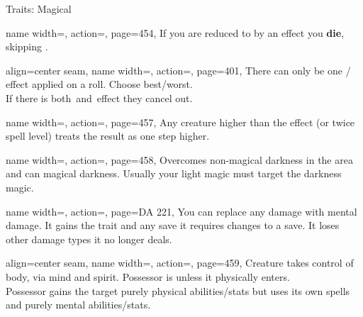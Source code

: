 \begin{PageFrontLandscape}
\begin{TablesHalf}{\frontTableHeight}
\begin{Table}{Traits: Magical}
\begin{entry}{}{%
                name width=\conditionLength,%
                action=\Death,
                page=454,
            }
                If you are reduced to  \HPs by an effect you \textbf{die}, skipping .
            \end{entry}
            \begin{entry}{}{%
                align=center seam,
                name width=\conditionLength,%
                action=\stackbox[l][c]{\Fortune\\\vspace{-0.6ex}\Misfortune},
                page=401,
            }
                There can only be one \Fortune/\Misfortune\,effect applied on a roll.
                Choose best/worst.\\
                If there is both \Fortune\,and \Misfortune\,effect they cancel out.
            \end{entry}
            \begin{entry}{}{%
                name width=\conditionLength,%
                action=\Incapacitation,
                page=457,
            }
                Any creature higher than the effect (or twice spell level) treats the result as one step higher.
            \end{entry}
            \begin{entry}{}{%
                name width=\conditionLength,%
                action=\Light,
                page=458,
            }
                Overcomes non-magical darkness in the area and can  magical darkness.
                Usually your light magic must target the darkness magic.
            \end{entry}
            \begin{entry}{}{%
                name width=\conditionLength,%
                action=\Mindshift,
                page=DA 221,
            }
                You can replace any damage with mental damage.
                It gains the \Mental trait and any save it requires changes to a \WillT save.
                It loses other damage types it no longer deals.
            \end{entry}
            \begin{entry}{}{%
                align=center seam,
                name width=\conditionLength,%
                action=\Possession,
                page=459,
            }
                Creature takes control of body, via mind and spirit. Possessor is \Unconscious unless it physically enters.\\
                Possessor gains the target purely physical abilities/stats but uses its own spells and purely mental abilities/stats.\\

\end{entry}
\end{Table}
\end{TablesHalf}
\end{PageFrontLandscape}
